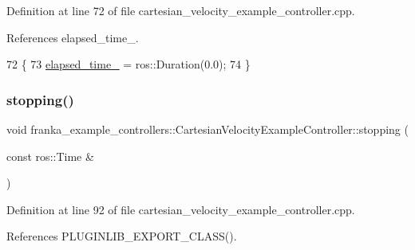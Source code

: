 Definition at line 72 of file cartesian\+\_\+velocity\+\_\+example\+\_\+controller.\+cpp.



References elapsed\+\_\+time\+\_\+.


\begin{DoxyCode}
72                                                                   \{
73   \hyperlink{classfranka__example__controllers_1_1CartesianVelocityExampleController_aea64d1bd4901f1b2a3f953f53c9d973c}{elapsed\_time\_} = ros::Duration(0.0);
74 \}
\end{DoxyCode}
\mbox{\label{classfranka__example__controllers_1_1CartesianVelocityExampleController_a03ffcb4dd32fa51329f7600384ff22d6}} 
\subsubsection{\texorpdfstring{stopping()}{stopping()}}
{\footnotesize\ttfamily void franka\+\_\+example\+\_\+controllers\+::\+Cartesian\+Velocity\+Example\+Controller\+::stopping (\begin{DoxyParamCaption}\item[{const ros\+::\+Time \&}]{ }\end{DoxyParamCaption})\hspace{0.3cm}{\ttfamily [override]}}



Definition at line 92 of file cartesian\+\_\+velocity\+\_\+example\+\_\+controller.\+cpp.



References P\+L\+U\+G\+I\+N\+L\+I\+B\+\_\+\+E\+X\+P\+O\+R\+T\+\_\+\+C\+L\+A\+S\+S().


